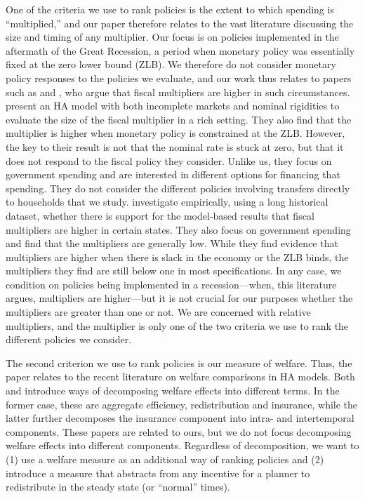 \documentclass[\econtexRoot/HAFiscal]{subfiles}
\begin{document}
One of the criteria we use to rank policies is the extent to which spending is ``multiplied,'' and our paper therefore relates to the vast literature discussing the size and timing of any multiplier. Our focus is on policies implemented in the aftermath of the Great Recession, a period when monetary policy was essentially fixed at the zero lower bound (ZLB). We therefore do not consider monetary policy responses to the policies we evaluate, and our work thus relates to papers such as \cite{christiano2011government} and \cite{eggertsson2011fiscal}, who argue that fiscal multipliers are higher in such circumstances. \cite{hagedorn2019fiscal} present an HA model with both incomplete markets and nominal rigidities to evaluate the size of the fiscal multiplier in a rich setting. They also find that the multiplier is higher when monetary policy is constrained at the ZLB. However, the key to their result is not that the nominal rate is stuck at zero, but that it does not respond to the fiscal policy they consider. Unlike us, they focus on government spending and are interested in different options for financing that spending. They do not consider the different policies involving transfers directly to households that we study. \cite{ramey2018government} investigate empirically, using a long historical dataset, whether there is support for the model-based results that fiscal multipliers are higher in certain states. They also focus on government spending and find that the multipliers are generally low. While they find evidence that multipliers are higher when there is slack in the economy or the ZLB binds, the multipliers they find are still below one in most specifications. In any case, we condition on policies being implemented in a recession---when, this literature argues, multipliers are higher---but it is not crucial for our purposes whether the multipliers are greater than one or not. We are concerned with relative multipliers, and the multiplier is only one of the two criteria we use to rank the different policies we consider. 

The second criterion we use to rank policies is our measure of welfare. Thus, the paper relates to the recent literature on welfare comparisons in HA models. Both \cite{bhandari2021efficiency} and \cite{davila2022welfare} introduce ways of decomposing welfare effects into different terms. In the former case, these are aggregate efficiency, redistribution and insurance, while the latter further decomposes the insurance component into intra- and intertemporal components. These papers are related to ours, but we do not focus decomposing welfare effects into different components. Regardless of decomposition, we want to (1) use a welfare measure as an additional way of ranking policies and (2) introduce a measure that abstracts from any incentive for a planner to redistribute in the steady state (or ``normal'' times).
\end{document}
